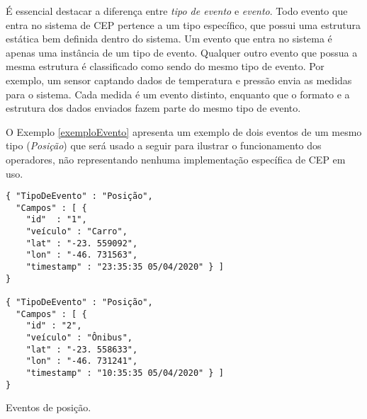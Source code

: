 % 
É essencial destacar a diferença entre \textit{tipo de evento} e \textit{evento}. Todo evento que entra no sistema de CEP pertence a um tipo específico, que possui uma estrutura estática bem definida dentro do sistema. Um evento que entra no sistema é apenas uma instância de um tipo de evento. Qualquer outro evento que possua a mesma estrutura é classificado como sendo do mesmo tipo de evento. Por exemplo, um sensor captando dados de temperatura e pressão envia as medidas para o sistema. Cada medida é um evento distinto, enquanto que o formato e a estrutura dos dados enviados fazem parte do mesmo tipo de evento. %

O Exemplo \ref{exemploEvento} apresenta um exemplo de dois eventos de um mesmo tipo (\textit{Posição}) que será usado a seguir para ilustrar o funcionamento dos operadores, não representando nenhuma implementação específica de CEP em uso.







\begin{evento}[t]

\begin{verbatim} 
{ "TipoDeEvento" : "Posição",
  "Campos" : [ {
    "id"  : "1",
    "veículo" : "Carro",
    "lat" : "-23. 559092",
    "lon" : "-46. 731563",
    "timestamp" : "23:35:35 05/04/2020" } ]
}

{ "TipoDeEvento" : "Posição",
  "Campos" : [ {
    "id" : "2",
    "veículo" : "Ônibus",
    "lat" : "-23. 558633",
    "lon" : "-46. 731241",
    "timestamp" : "10:35:35 05/04/2020" } ]
}
\end{verbatim}
\caption{Eventos de posição.}
\label{exemploEvento}
\end{evento}


